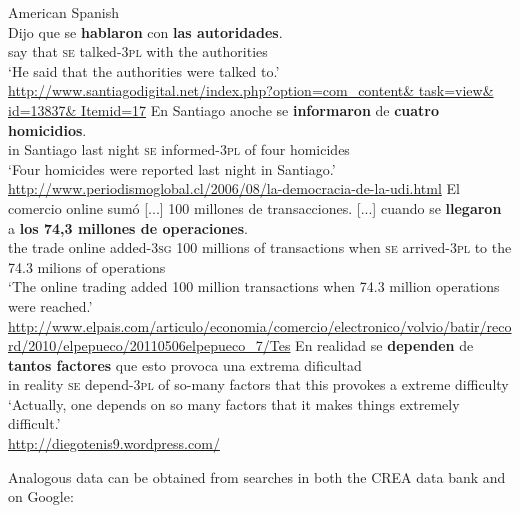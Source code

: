 \documentclass[output=paper]{langsci/langscibook}
\begin{document}
\ea%
    American Spanish\label{ex:gallego:27}\\
    \ea
    \gll Dijo que se  \textbf{hablaron}    con   \textbf{las   autoridades}.\\
         say  that \textsc{se}   talked-\textsc{3pl}  with  the  authorities\\
    \glt ‘He said that the authorities were talked to.’\\
    {\small\url{http://www.santiagodigital.net/index.php?option=com\_content\& task=view\& id=13837\& Itemid=17}}
    \ex
    \gll En Santiago anoche    se  \textbf{informaron}   de \textbf{cuatro  homicidios}.\\
         in  Santiago last night \textsc{se}   informed-\textsc{3pl} of  four     homicides\\
    \glt ‘Four homicides were reported last night in Santiago.’\\
    {\small\url{http://www.periodismoglobal.cl/2006/08/la-democracia-de-la-udi.html}}
    \ex
    \gll El  comercio online sumó [...]   100 millones de transacciones.          [...] cuando se   \textbf{llegaron}       a   \textbf{los 74,3 millones  de operaciones}.\\
         the trade       online added{}-\textsc{3sg} 100 millions  of transactions                when    \textsc{se}   arrived{}-\textsc{3pl}  to the 74.3 milions    of operations\\
    \glt ‘The online trading added 100 million transactions when 74.3 million operations were reached.’\\
    {\small\url{http://www.elpais.com/articulo/economia/comercio/electronico/volvio/batir/record/2010/elpepueco/20110506elpepueco\_7/Tes}}
    \ex
    \gll En realidad se  \textbf{dependen} de  \textbf{tantos factores}  que  esto provoca  una extrema  dificultad\\
         in   reality   \textsc{se}   depend{}-\textsc{3pl} of   so-many    factors  that this provokes a    extreme  difficulty\\
    \glt ‘Actually, one depends on so many factors that it makes things extremely difficult.’\\
         {\small\url{http://diegotenis9.wordpress.com/}}
    \z
\z    

Analogous data can be obtained from searches in both the CREA data bank and on Google:
\end{document}
